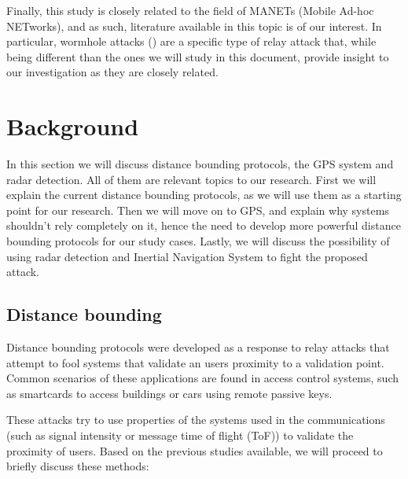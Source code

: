 \documentclass{article}
\begin{document}
Finally, this study is closely related to the field of MANETs (Mobile Ad-hoc NETworks), and as such, literature available in this topic is of our interest. In particular, wormhole attacks (\cite{hu2006wormhole, maheshwari2007detecting, goyal2010literature}) are a specific type of relay attack that, while being different than the ones we will study in this document, provide insight to our investigation as they are closely related.








\section{Background}
\label{sec:background}

In this section we will discuss distance bounding protocols, the GPS system and radar detection. All of them are relevant topics to our research. First we will explain the current distance bounding protocols, as we will use them as a starting point for our research. Then we will move on to GPS, and explain why systems shouldn't rely completely on it, hence the need to develop more powerful distance bounding protocols for our study cases. Lastly, we will discuss the possibility of using radar detection and Inertial Navigation System to fight the proposed attack.

\subsection{Distance bounding}

Distance bounding protocols were developed as a response to relay attacks that attempt to fool systems that validate an users proximity to a validation point. Common scenarios of these applications are found in access control systems, such as smartcards to access buildings or cars using remote passive keys.

These attacks try to use properties of the systems used in the communications (such as signal intensity or message time of flight (ToF)) to validate the proximity of users. Based on the previous studies available\cite{capkun2006secure}, we will proceed to briefly discuss these methods:
\end{document}
